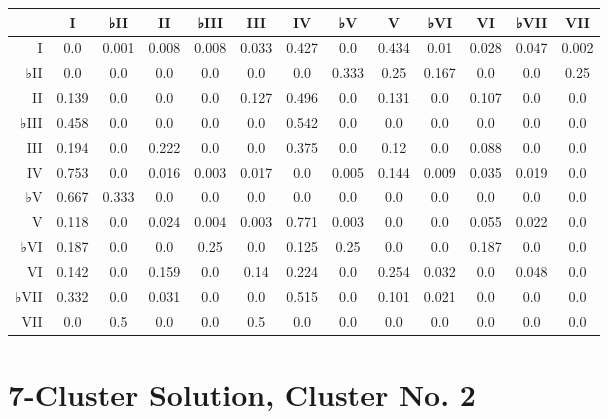 \begin{table}[htbp]
\begin{minipage}{\linewidth}
\setlength{\tymax}{0.5\linewidth}
\centering
\small
\begin{tabulary}{\textwidth}{@{}RCCCCCCCCCCCC@{}} \toprule
&I&♭II&II&♭III&III&IV&♭V&V&♭VI&VI&♭VII&VII\\
\midrule
I&0.0&0.001&0.008&0.008&0.033&0.427&0.0&0.434&0.01&0.028&0.047&0.002\\
♭II&0.0&0.0&0.0&0.0&0.0&0.0&0.333&0.25&0.167&0.0&0.0&0.25\\
II&0.139&0.0&0.0&0.0&0.127&0.496&0.0&0.131&0.0&0.107&0.0&0.0\\
♭III&0.458&0.0&0.0&0.0&0.0&0.542&0.0&0.0&0.0&0.0&0.0&0.0\\
III&0.194&0.0&0.222&0.0&0.0&0.375&0.0&0.12&0.0&0.088&0.0&0.0\\
IV&0.753&0.0&0.016&0.003&0.017&0.0&0.005&0.144&0.009&0.035&0.019&0.0\\
♭V&0.667&0.333&0.0&0.0&0.0&0.0&0.0&0.0&0.0&0.0&0.0&0.0\\
V&0.118&0.0&0.024&0.004&0.003&0.771&0.003&0.0&0.0&0.055&0.022&0.0\\
♭VI&0.187&0.0&0.0&0.25&0.0&0.125&0.25&0.0&0.0&0.187&0.0&0.0\\
VI&0.142&0.0&0.159&0.0&0.14&0.224&0.0&0.254&0.032&0.0&0.048&0.0\\
♭VII&0.332&0.0&0.031&0.0&0.0&0.515&0.0&0.101&0.021&0.0&0.0&0.0\\
VII&0.0&0.5&0.0&0.0&0.5&0.0&0.0&0.0&0.0&0.0&0.0&0.0\\

\bottomrule

\end{tabulary}
\end{minipage}
\end{table}

\section{7-Cluster Solution, Cluster No. 2}
\label{7-clustersolutionclusterno.2}


